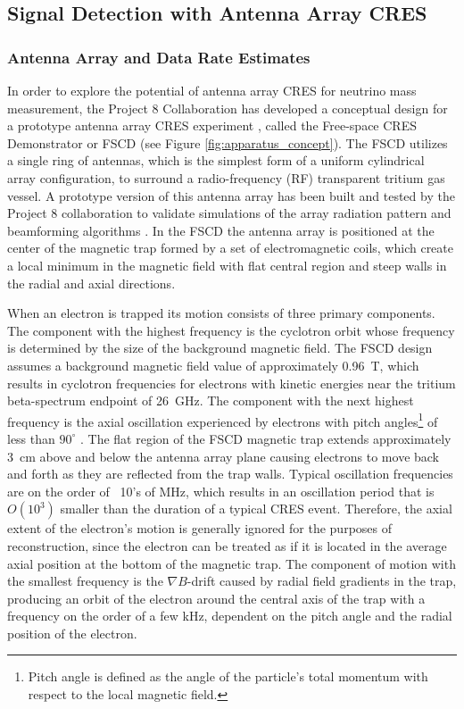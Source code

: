 \subsection{Signal Detection with Antenna Array CRES}
\label{sec:real-time-triggering}


\subsubsection{Antenna Array and Data Rate Estimates}
\label{sec:aa-and-daq}

In order to explore the potential of antenna array CRES for neutrino mass measurement, the Project 8 Collaboration has developed a conceptual design for a prototype antenna array CRES experiment \cite{p8PanicProc,p8snowmass2022}, called the Free-space CRES Demonstrator or FSCD (see Figure \ref{fig:apparatus_concept}). The FSCD utilizes a single ring of antennas, which is the simplest form of a uniform cylindrical array configuration, to surround a radio-frequency (RF) transparent tritium gas vessel. A prototype version of this antenna array has been built and tested by the Project 8 collaboration \cite{p8jugaad} to validate simulations of the array radiation pattern and beamforming algorithms \cite{balanis}. In the FSCD the antenna array is positioned at the center of the magnetic trap formed by a set of electromagnetic coils, which create a local minimum in the magnetic field with flat central region and steep walls in the radial and axial directions. 

When an electron is trapped its motion consists of three primary components. The component with the highest frequency is the cyclotron orbit whose frequency is determined by the size of the background magnetic field. The FSCD design assumes a background magnetic field value of approximately 0.96~T, which results in cyclotron frequencies for electrons with kinetic energies near the tritium beta-spectrum endpoint of 26~GHz. The component with the next highest frequency is the axial oscillation experienced by electrons with pitch angles\footnote{Pitch angle is defined as the angle of the particle's total momentum with respect to the local magnetic field.} of less than $90^\circ$ \cite{p8pheno}. The flat region of the FSCD magnetic trap extends approximately 3~cm above and below the antenna array plane causing electrons to move back and forth as they are reflected from the trap walls. Typical oscillation frequencies are on the order of ~10's of MHz, which results in an oscillation period that is $O(10^3)$ smaller than the duration of a typical CRES event. Therefore, the axial extent of the electron's motion is generally ignored for the purposes of reconstruction, since the electron can be treated as if it is located in the average axial position at the bottom of the magnetic trap. The component of motion with the smallest frequency is the $\nabla B$-drift caused by radial field gradients in the trap, producing an orbit of the electron around the central axis of the trap with a frequency on the order of a few kHz, dependent on the pitch angle and the radial position of the electron. 

